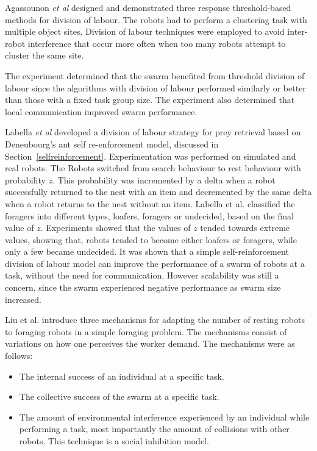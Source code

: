 Agassounon \textit{et al} \cite{agassounon2002efficiency} designed and demonstrated three response threshold-based methods for division of labour. The robots had to perform a clustering task with multiple object sites. Division of labour techniques were employed to avoid inter-robot interference that occur more often when too many robots attempt to cluster the same site. 

The experiment determined that the swarm benefited from threshold division of labour since the algorithms with division of labour performed similarly or better than those with a fixed task group size. The experiment also determined that local communication improved swarm performance.

Labella \textit{et al} \cite{labella2006division} developed a division of labour strategy for prey retrieval based on Deneubourg's ant self re-enforcement model, discussed in Section~\ref{selfreinforcement}. Experimentation was performed on simulated and real robots. The Robots switched from search behaviour to rest behaviour with probability $z$. This probability was incremented by a delta when a robot successfully returned to the nest with an item and decremented by the same delta when a robot returns to the nest without an item. Labella et al. classified the foragers into different types, loafers, foragers or  undecided, based on the final value of $z$. Experiments showed that the values of $z$ tended towards extreme values, showing that, robots tended to become either loafers or foragers, while only a few became undecided. It was shown that a simple self-reinforcement division of labour model can improve the performance of a swarm of robots at a task, without the need for communication. However scalability was still a concern, since the swarm experienced negative performance as swarm size increased. 

Liu et al. \cite{liu2007towards} introduce three mechanisms for adapting the number of resting robots to foraging robots in a simple foraging problem. The mechanisms consist of variations on how one perceives the worker demand. The mechanisms were as follows:

\begin{itemize}
	\item The internal success of an individual at a specific task.
	\item The collective success of the swarm at a specific task. 
	\item  The amount of environmental interference experienced by an individual while performing a task, most importantly the amount of collisions with other robots. This technique is a social inhibition model.
\end{itemize}

